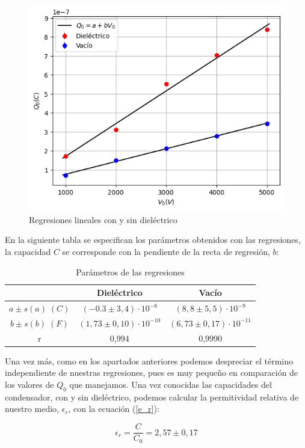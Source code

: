 \documentclass[a4paper,12pt,titlepage]{article}
\begin{document}
\begin{figure}[h!]
    \centering
    \includegraphics[width=0.65\linewidth]{dielectrico.png}
    \caption{Regresiones lineales con y sin dieléctrico}
    \label{fig:enter-label}
\end{figure}

En la siguiente tabla se especifican los parámetros obtenidos con las regresiones, la capacidad $C$ se corresponde con la pendiente de la recta de regresión, $b$:

\begin{table}[h!]
\centering
\begin{tabular}{c|c|c|}
\cline{2-3}
    & \cellcolor[HTML]{f4a9a7} Dieléctrico & \cellcolor[HTML]{c0fdfb}Vacío \\ \hline
\multicolumn{1}{|c|}{$a\pm s(a) \; (C)$} & $(-0.3 \pm 3,4)\cdot 10^{-8}$ & $(8,8 \pm 5,5) \cdot 10^{-9}$ \\ \hline
\multicolumn{1}{|c|}{$b\pm s(b) \; (F)$} & $(1,73\pm 0,10)\cdot 10^{-10}$ & $(6,73 \pm 0,17)\cdot 10^{-11}$ \\ \hline
\multicolumn{1}{|c|}{r}           & 0,994 &  0,9990 \\ \hline
\end{tabular}
\caption{Parámetros de las regresiones}
\label{tab:my-table}
\end{table}

Una vez más, como en los apartados anteriores podemos despreciar el término independiente de nuestras regresiones, pues es muy pequeño en comparación de los valores de $Q_0$ que manejamos. Una vez conocidas las capacidades del condensador, con y sin dieléctrico, podemos calcular la permitividad relativa de nuestro medio, $\epsilon_r$, con la ecuación (\ref{e_r}):

\begin{equation}
    \epsilon_r = \frac{C}{C_0} = 2,57 \pm 0,17
\end{equation}
\end{document}
